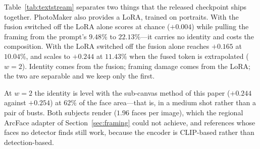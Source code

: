 \documentclass[10pt,twocolumn,letterpaper]{article}
\begin{document}
\begin{table}[htbp]
\centering
\caption{%
  \textbf{Text-stream identity keeps the prompt's framing.}  Photographic
  human-human pairs, $24$ samples, prompted as medium shots.  ArcFace does not
  move with framing; face area shows what the prompt asked for ($9.48\%$) and
  what each configuration delivered.  The fusion adds identity without moving
  the framing; PhotoMaker's LoRA moves the framing without adding identity.%
}
\label{tab:textstream}
\end{table}

Table~\ref{tab:textstream} separates two things that the released checkpoint
ships together.  PhotoMaker also provides a LoRA, trained on portraits.  With
the fusion switched off the LoRA alone scores at chance ($+0.004$) while
pulling the framing from the prompt's $9.48\%$ to $22.13\%$---it carries no
identity and costs the composition.  With the LoRA switched off the fusion
alone reaches $+0.165$ at $10.04\%$, and scales to $+0.244$ at $11.43\%$ when
the fused token is extrapolated ($w{=}2$).  Identity comes from the fusion;
framing damage comes from the LoRA; the two are separable and we keep only the
first.

At $w{=}2$ the identity is level with the sub-canvas method of this paper
($+0.244$ against $+0.254$) at $62\%$ of the face area---that is, in a medium
shot rather than a pair of busts.  Both subjects render ($1.96$ faces per
image), which the regional ArcFace adapter of Section~\ref{sec:framing} could
not achieve, and references whose faces no detector finds still work, because
the encoder is CLIP-based rather than detection-based.
\end{document}
